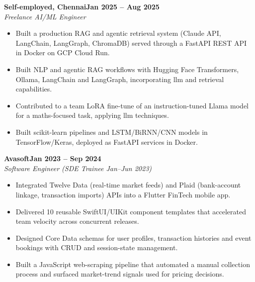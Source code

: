 \documentclass[a4paper,11pt]{article}
\newcommand{\entry}[4]{\needspace{4\baselineskip}\noindent\textbf{#1}\hfill\textbf{#2}\\ \textit{#3}\hfill\textit{#4}\par}
\begin{document}
\vspace{4pt}
\entry{Self-employed, Chennai}{Jan 2025 – Aug 2025}{Freelance AI/ML Engineer}{}
\begin{itemize}
  \item Built a production RAG and agentic retrieval system (Claude API, LangChain, LangGraph, ChromaDB) served through a FastAPI REST API in Docker on GCP Cloud Run.
  \item Built NLP and agentic RAG workflows with Hugging Face Transformers, Ollama, LangChain and LangGraph, incorporating llm and retrieval capabilities.
  \item Contributed to a team LoRA fine-tune of an instruction-tuned Llama model for a maths-focused task, applying llm techniques.
  \item Built scikit-learn pipelines and LSTM/BiRNN/CNN models in TensorFlow/Keras, deployed as FastAPI services in Docker.
\end{itemize}
\vspace{4pt}
\entry{Avasoft}{Jan 2023 – Sep 2024}{Software Engineer (SDE Trainee Jan–Jun 2023)}{}
\begin{itemize}
  \item Integrated Twelve Data (real-time market feeds) and Plaid (bank-account linkage, transaction imports) APIs into a Flutter FinTech mobile app.
  \item Delivered 10 reusable SwiftUI/UIKit component templates that accelerated team velocity across concurrent releases.
  \item Designed Core Data schemas for user profiles, transaction histories and event bookings with CRUD and session-state management.
  \item Built a JavaScript web-scraping pipeline that automated a manual collection process and surfaced market-trend signals used for pricing decisions.
\end{itemize}

\end{document}
